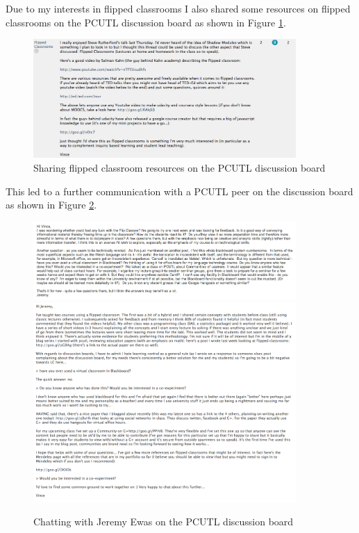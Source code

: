 \documentclass[a4paper,12pt]{article}
\begin{document}
Due to my interests in flipped classrooms I also shared some resources on flipped classrooms on the PCUTL discussion board as shown in Figure \ref{flipped_classrooms}.\\

\begin{figure}[htdp]
    \begin{center}
        \includegraphics[width=10cm]{./images/flipped_classrooms}
    \end{center}
    \caption{Sharing flipped classroom resources on the PCUTL discussion board}
    \label{flipped_classrooms}
\end{figure}

This led to a further communication with a PCUTL peer on the discussion board as shown in Figure \ref{chat_with_jeremy}.\\

\begin{figure}[htdp]
    \begin{center}
        \includegraphics[width=10cm]{./images/chat_with_jeremy-a}
        \includegraphics[width=10cm]{./images/chat_with_jeremy-b}
    \end{center}
    \caption{Chatting with Jeremy Ewas on the PCUTL discussion board}
    \label{chat_with_jeremy}
\end{figure}
\end{document}
